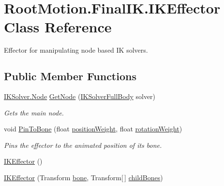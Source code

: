 \hypertarget{class_root_motion_1_1_final_i_k_1_1_i_k_effector}{}\section{Root\+Motion.\+Final\+I\+K.\+I\+K\+Effector Class Reference}
\label{class_root_motion_1_1_final_i_k_1_1_i_k_effector}


Effector for manipulating node based IK solvers.  


\subsection*{Public Member Functions}
\begin{DoxyCompactItemize}
\item 
\mbox{\hyperlink{class_root_motion_1_1_final_i_k_1_1_i_k_solver_1_1_node}{I\+K\+Solver.\+Node}} \mbox{\hyperlink{class_root_motion_1_1_final_i_k_1_1_i_k_effector_a33923cbb6bb0f5a8f065194bc793d2cf}{Get\+Node}} (\mbox{\hyperlink{class_root_motion_1_1_final_i_k_1_1_i_k_solver_full_body}{I\+K\+Solver\+Full\+Body}} solver)
\begin{DoxyCompactList}\small\item\em Gets the main node. \end{DoxyCompactList}\item 
void \mbox{\hyperlink{class_root_motion_1_1_final_i_k_1_1_i_k_effector_a3ebaa0d3b41215faeb0a1637e8c16afc}{Pin\+To\+Bone}} (float \mbox{\hyperlink{class_root_motion_1_1_final_i_k_1_1_i_k_effector_a0e404e3d964a2d69ff07c6d0f19fa983}{position\+Weight}}, float \mbox{\hyperlink{class_root_motion_1_1_final_i_k_1_1_i_k_effector_affd9fe48e2afabdda7c544c63ee5fb9f}{rotation\+Weight}})
\begin{DoxyCompactList}\small\item\em Pins the effector to the animated position of it\textquotesingle{}s bone. \end{DoxyCompactList}\item 
\mbox{\hyperlink{class_root_motion_1_1_final_i_k_1_1_i_k_effector_a1b1d8ba4267fde961d7f26dbac099915}{I\+K\+Effector}} ()
\item 
\mbox{\hyperlink{class_root_motion_1_1_final_i_k_1_1_i_k_effector_a2dda2a8355e2fa40fd7e78755cf3d89c}{I\+K\+Effector}} (Transform \mbox{\hyperlink{class_root_motion_1_1_final_i_k_1_1_i_k_effector_afaafca7ed961d8697dc0d673871a9f7d}{bone}}, Transform\mbox{[}$\,$\mbox{]} \mbox{\hyperlink{class_root_motion_1_1_final_i_k_1_1_i_k_effector_aa309536ed05fe57423325c4623f305b2}{child\+Bones}})

\end{DoxyCompactItemize}

